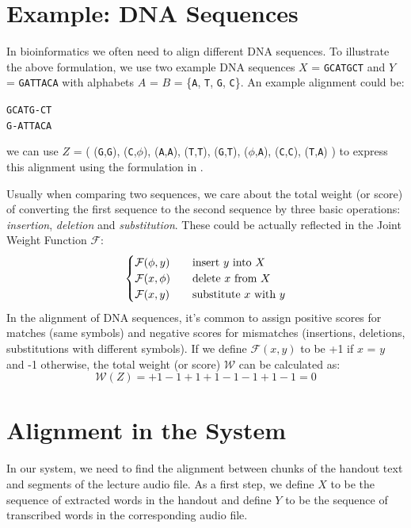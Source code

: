 \section{Example: DNA Sequences}

In bioinformatics we often need to align different DNA sequences. To illustrate the above formulation, we use two example DNA sequences $X$ = \texttt{GCATGCT} and $Y$ = \texttt{GATTACA} with alphabets $A$ = $B$ = \{\texttt{A}, \texttt{T}, \texttt{G}, \texttt{C}\}. An example alignment could be:
\begin{center}
  \texttt{GCATG-CT}\\
  \texttt{G-ATTACA}
\end{center}
we can use $Z$ = (
  (\texttt{G},\texttt{G}),
  (\texttt{C},$\phi$),
  (\texttt{A},\texttt{A}),
  (\texttt{T},\texttt{T}),
  (\texttt{G},\texttt{T}),
  ($\phi$,\texttt{A}),
  (\texttt{C},\texttt{C}),
  (\texttt{T},\texttt{A})
) to express this alignment using the formulation in .

Usually when comparing two sequences, we care about the total weight (or score) of converting the first sequence to the second sequence by three basic operations: \textit{insertion}, \textit{deletion} and \textit{substitution}. These could be actually reflected in the Joint Weight Function $\mathcal{F}$:
\[
  \begin{cases}
    \mathcal{F}(\phi,y) & \text{\quad insert } y \text{ into } X \\
    \mathcal{F}(x,\phi) & \text{\quad delete } x \text{ from } X \\
    \mathcal{F}(x,y) & \text{\quad substitute } x \text{ with } y
  \end{cases}
\]
In the alignment of DNA sequences, it's common to assign positive scores for matches (same symbols) and negative scores for mismatches (insertions, deletions, substitutions with different symbols). If we define $\mathcal{F}(x,y)$ to be +1 if $x$ = $y$ and -1 otherwise, the total weight (or score) $\mathcal{W}$ can be calculated as:
\[ \mathcal{W}(Z) = + 1 - 1 + 1 + 1 - 1 - 1 + 1 - 1 = 0 \]

\section{Alignment in the System}
\label{sec:align-in-system}

In our system, we need to find the alignment between chunks of the handout text and segments of the lecture audio file. As a first step, we define $X$ to be the sequence of extracted words in the handout and define $Y$ to be the sequence of transcribed words in the corresponding audio file.

